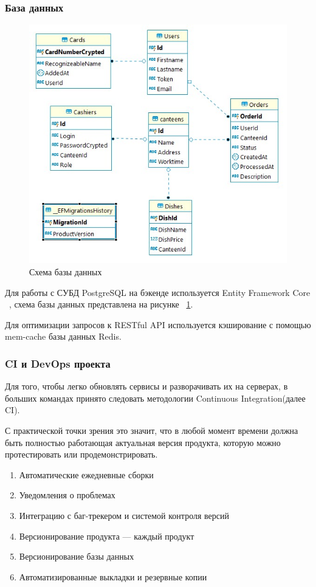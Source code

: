 \documentclass[14pt]{matmex-diploma-custom}
\begin{document}
	    \subsubsection{База данных}
	        \begin{figure}
	            \centering
	            \includegraphics[scale=0.8]{images/database_arch_01.jpg}
	            \caption{Схема базы данных}
	            \label{db_arch}
	        \end{figure}
	        Для работы с СУБД PostgreSQL на бэкенде используется Entity Framework Core ~\cite{npgsql_efcore_doc},
	        схема базы данных представлена на рисунке ~\ref{db_arch}.

	        Для оптимизации запросов к RESTful API используется кэширование с помощью mem-cache базы данных Redis\cite{redis_doc}.

	    \subsubsection{CI и DevOps проекта}
	        Для того, чтобы легко обновлять сервисы и разворачивать их на серверах, в больших командах принято следовать методологии Continuous Integration(далее CI).

	        С практической точки зрения это значит, что в любой момент времени должна быть полностью работающая актуальная версия продукта, которую можно протестировать или продемонстрировать.
	        \begin{enumerate}
	            \item Автоматические ежедневные сборки
	            \item Уведомления о проблемах
	            \item Интеграцию с баг-трекером и системой контроля версий
	            \item Версионирование продукта — каждый продукт
	            \item Версионирование базы данных
	            \item Автоматизированные выкладки и резервные копии
	        \end{enumerate}
\end{document}
